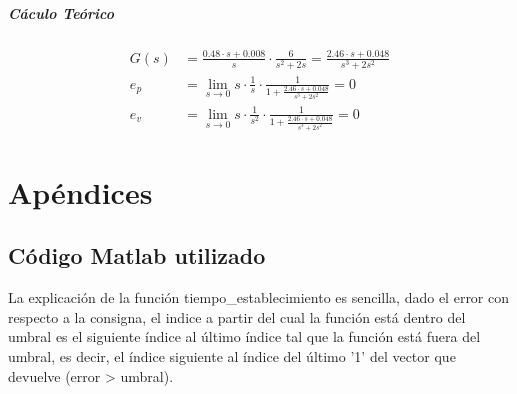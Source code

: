 \documentclass[paper=a4, fontsize=11pt]{scrreprt} %
\numberwithin{equation}{section} %
\numberwithin{figure}{section} %
\numberwithin{table}{section} %
\begin{document}
    \subsubsection{Cáculo Teórico}
    \begin{align}
        G(s) &= \frac{0.48\cdot s + 0.008}{s} \cdot \frac{6}{s^2+2s} = \frac{2.46 \cdot s + 0.048}{s^3+2s^2}\\
        e_p &= \lim\limits_{s \rightarrow 0} s \cdot \frac{1}{s} \cdot \frac{1}{1+\frac{2.46 \cdot s + 0.048}{s^3+2s^2}} = 0\\
        e_v &= \lim\limits_{s \rightarrow 0} s \cdot \frac{1}{s^2} \cdot \frac{1}{1+\frac{2.46 \cdot s + 0.048}{s^3+2s^2}} = 0
    \end{align}
    \part*{Apéndices}
    \appendix
    \chapter{Código Matlab utilizado}
    
    
    
    
    La explicación de la función tiempo\_establecimiento es sencilla, dado el error con respecto a la consigna, el indice a partir del cual la función está dentro del umbral es el siguiente índice al último índice tal que la función está fuera del umbral, es decir, el índice siguiente al índice del último '1' del vector que devuelve (error > umbral).
\end{document}
